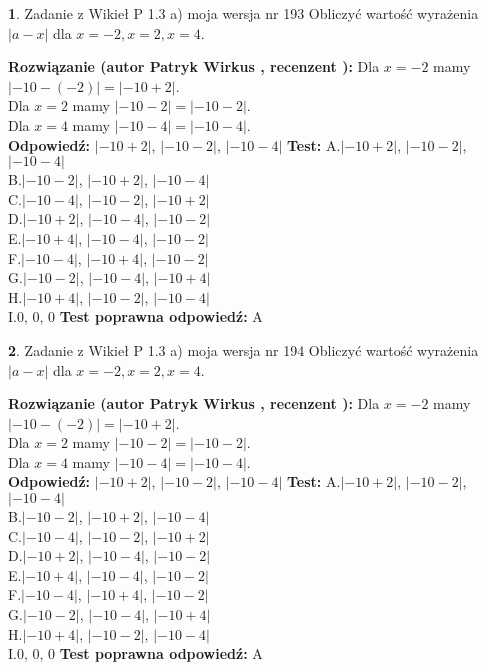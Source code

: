 \documentclass[12pt, a4paper]{article}
\theoremstyle{definition} %
\newtheorem{zad}{}
\newcommand{\zadStart}[1]{\begin{zad}#1\newline}
\newcommand{\zadStop}{\end{zad}}
\newcommand{\rozwStart}[2]{\noindent \textbf{Rozwiązanie (autor #1 , recenzent #2): }\newline}
\newcommand{\rozwStop}{\newline}
\newcommand{\odpStart}{\noindent \textbf{Odpowiedź:}\newline}
\newcommand{\odpStop}{\newline}
\newcommand{\testStart}{\noindent \textbf{Test:}\newline}
\newcommand{\testStop}{\newline}
\newcommand{\kluczStart}{\noindent \textbf{Test poprawna odpowiedź:}\newline}
\newcommand{\kluczStop}{\newline}
\begin{document}
\zadStart{Zadanie z Wikieł P 1.3 a) moja wersja nr 193}
Obliczyć wartość wyrażenia $|a - x|$ dla $x=-2,x=2,x=4$.
\zadStop
\rozwStart{Patryk Wirkus}{}
Dla $x = -2$ mamy $|-10 - (-2)| = |-10 + 2|$.\\
Dla $x = 2$ mamy $|-10 - 2| = |-10 - 2|$.\\
Dla $x = 4$ mamy $|-10 - 4| = |-10 - 4|$.\\
\rozwStop
\odpStart
$|-10 + 2|$, $|-10 - 2|$, $|-10 - 4|$
\odpStop
\testStart
A.$|-10 + 2|$, $|-10 - 2|$, $|-10 - 4|$\\
B.$|-10 - 2|$, $|-10 + 2|$, $|-10 - 4|$\\
C.$|-10 - 4|$, $|-10 - 2|$, $|-10 + 2|$\\
D.$|-10 + 2|$, $|-10 - 4|$, $|-10 - 2|$\\
E.$|-10 + 4|$, $|-10 - 4|$, $|-10 - 2|$\\
F.$|-10 - 4|$, $|-10 + 4|$, $|-10 - 2|$\\
G.$|-10 - 2|$, $|-10 - 4|$, $|-10 + 4|$\\
H.$|-10 + 4|$, $|-10 - 2|$, $|-10 - 4|$\\
I.$0$, $0$, $0$
\testStop
\kluczStart
A
\kluczStop



\zadStart{Zadanie z Wikieł P 1.3 a) moja wersja nr 194}
Obliczyć wartość wyrażenia $|a - x|$ dla $x=-2,x=2,x=4$.
\zadStop
\rozwStart{Patryk Wirkus}{}
Dla $x = -2$ mamy $|-10 - (-2)| = |-10 + 2|$.\\
Dla $x = 2$ mamy $|-10 - 2| = |-10 - 2|$.\\
Dla $x = 4$ mamy $|-10 - 4| = |-10 - 4|$.\\
\rozwStop
\odpStart
$|-10 + 2|$, $|-10 - 2|$, $|-10 - 4|$
\odpStop
\testStart
A.$|-10 + 2|$, $|-10 - 2|$, $|-10 - 4|$\\
B.$|-10 - 2|$, $|-10 + 2|$, $|-10 - 4|$\\
C.$|-10 - 4|$, $|-10 - 2|$, $|-10 + 2|$\\
D.$|-10 + 2|$, $|-10 - 4|$, $|-10 - 2|$\\
E.$|-10 + 4|$, $|-10 - 4|$, $|-10 - 2|$\\
F.$|-10 - 4|$, $|-10 + 4|$, $|-10 - 2|$\\
G.$|-10 - 2|$, $|-10 - 4|$, $|-10 + 4|$\\
H.$|-10 + 4|$, $|-10 - 2|$, $|-10 - 4|$\\
I.$0$, $0$, $0$
\testStop
\kluczStart
A
\kluczStop
\end{document}
